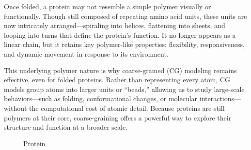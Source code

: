 \documentclass[12pt]{article}
\begin{document}
\begin{flushleft}
Once folded, a protein may not resemble a simple polymer visually or functionally. Though still composed of repeating amino acid units, these units are now intricately arranged—spiraling into helices, flattening into sheets, and looping into turns that define the protein's function. It no longer appears as a linear chain, but it retains key polymer-like properties: flexibility, responsiveness, and dynamic movement in response to its environment.

This underlying polymer nature is why coarse-grained (CG) modeling remains effective, even for folded proteins. Rather than representing every atom, CG models group atoms into larger units or “beads,” allowing us to study large-scale behaviors—such as folding, conformational changes, or molecular interactions—without the computational cost of atomic detail. Because proteins are still polymers at their core, coarse-graining offers a powerful way to explore their structure and function at a broader scale.


\begin{figure}[!ht]
  \centering
  
  \caption{Protein}
\end{figure}



\vspace{-2em} 

\end{flushleft}
\end{document}
